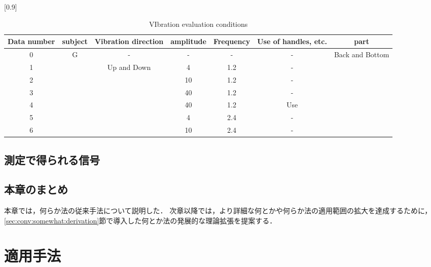 \begin{table}[b]
  \caption{VIbration evaluation conditions}
  \centering
  \scalebox{0.8}[0.9]{
  \begin{tabular}{|c|c|c|c|c|c|c|} \hline
    Data number & subject & Vibration direction & amplitude & Frequency &  Use of handles, etc. & part \\ \hline \hline
    0 & \multirow{7}{*}{G} & - & - & - & - & \multirow{7}{*}{Back and Bottom}   \\ \cline{1-1} \cline{3-3} \cline{4-4} \cline{5-5} \cline{6-6}
    1 & & \multirow{6}{*}{Up and Down} & 4 & 1.2 & - &  \\ \cline{1-1} \cline{4-4} \cline{5-5} \cline{6-6}
    2 & &  & 10 & 1.2 & - &   \\ \cline{1-1} \cline{4-4} \cline{5-5} \cline{6-6}
    3 & &  & 40 & 1.2 & - &   \\ \cline{1-1} \cline{4-4} \cline{5-5} \cline{6-6}
    4 & &  & 40 & 1.2 & Use &   \\ \cline{1-1} \cline{4-4} \cline{5-5} \cline{6-6}
    5 & &  & 4 & 2.4 & - &   \\ \cline{1-1} \cline{4-4} \cline{5-5} \cline{6-6}
    6 & &  & 10 & 2.4 & - &   \\ \hline
  \end{tabular}
  }
  \label{tab:vibevacondition}
\end{table}

\section{測定で得られる信号}
\label{sec:conv:signal}

\section{本章のまとめ}
本章では，何らか法の従来手法について説明した．
次章以降では，より詳細な何とかや何らか法の適用範囲の拡大を達成するために，
\ref{sec:conv:somewhat:derivation}節で導入した何とか法の発展的な理論拡張を提案する．


\chapter{適用手法}
\label{chap:conv}

